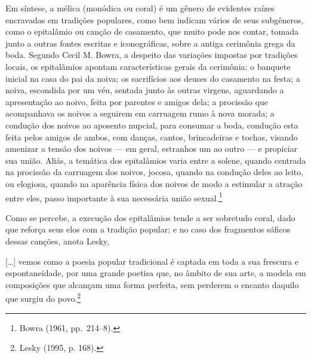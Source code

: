 Em síntese, a mélica (monódica ou coral) é um gênero de evidentes raízes
encravadas em tradições populares, como bem indicam vários de seus subgêneros,
como o epitalâmio ou canção de casamento, que muito pode nos contar, tomada
junto a outras fontes escritas e iconográficas, sobre a antiga cerimônia grega
da boda. Segundo Cecil M. Bowra, a despeito das variações
impostas por tradições locais, os epitalâmios apontam características gerais da
cerimônia: o banquete inicial na casa do pai da noiva; os sacrifícios aos
deuses do casamento na festa; a noiva, escondida por um véu, sentada junto às
outras virgens, aguardando a apresentação ao noivo, feita por parentes e amigos
dela; a procissão que acompanhava os noivos a seguirem em carruagem rumo à nova
morada; a condução dos noivos ao aposento nupcial, para consumar a boda,
condução esta feita pelos amigos de ambos, com danças, cantos, brincadeiras e
tochas, visando amenizar a tensão dos noivos --- em geral, estranhos um ao outro
--- e propiciar sua união. Aliás, a temática dos epitalâmios varia entre a
solene, quando centrada na procissão da carruagem dos noivos, jocosa, quando na
condução deles ao leito, ou elogiosa, quando na aparência física dos noivos de
modo a estimular a atração entre eles, passo importante à sua necessária união
sexual.\footnote{ Bowra (1961, pp.~214--8).}

Como se percebe, a execução dos epitalâmios tende a ser sobretudo coral, dado
que reforça seus elos com a tradição popular; e no caso dos fragmentos sáficos
dessas canções, anota Lesky, 

\begin{hedraquote}
\mbox[\ldots{}] vemos como a poesia popular
tradicional é captada em toda a sua frescura e espontaneidade, por uma grande
poetisa que, no âmbito de sua arte, a modela em composições que alcançam uma
forma perfeita, sem perderem o encanto daquilo que surgiu do povo.\footnote{ Lesky (1995, p. 168).}
\end{hedraquote}

